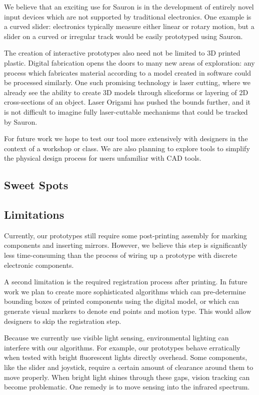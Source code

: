 We believe that an exciting use for Sauron is in the development of entirely novel input devices which are not supported by traditional electronics.  One example is a curved slider: electronics typically measure either linear or rotary motion, but a slider on a curved or irregular track would be easily prototyped using Sauron.

The creation of interactive prototypes also need not be limited to 3D printed plastic.  Digital fabrication opens the doors to many new areas of exploration: any process which fabricates material according to a model created in software could be processed similarly.  One such promising technology is laser cutting, where we already see the ability to create 3D models through sliceforms or layering of 2D cross-sections of an object.  Laser Origami \cite{Mueller-laserorigami} has pushed the bounds further, and it is not difficult to imagine fully laser-cuttable mechanisms that could be tracked by Sauron.

For future work we hope to test our tool more extensively with designers in the context of a workshop or class.  We are also planning to explore tools to simplify the physical design process for users unfamiliar with CAD tools. 

    \subsection{Sweet Spots}
    
    \subsection{Limitations}
    
    Currently, our prototypes still require some post-printing assembly for marking components and inserting mirrors. However, we believe this step is significantly less time-consuming than the process of wiring up a prototype with discrete electronic components.

A second limitation is the required registration process after printing.  In future work we plan to create more sophisticated algorithms which can pre-determine bounding boxes of printed components using the digital model, or which can generate visual markers to denote end points and motion type.  This would allow designers to skip the registration step.

Because we currently use visible light sensing, environmental lighting can interfere with our algorithms. For example, our prototypes behave erratically when tested with bright fluorescent lights directly overhead.  Some components, like the slider and joystick, require a certain amount of clearance around them to move properly. When bright light shines through these gaps, vision tracking can become problematic. One remedy is to move sensing into the infrared spectrum.%

